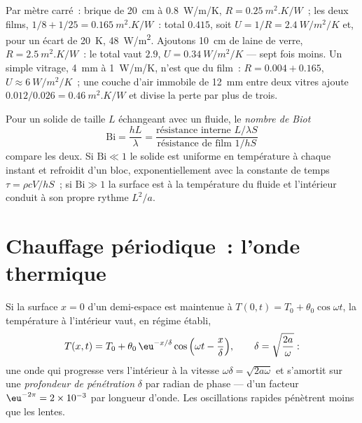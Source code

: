 \begin{example}\label{ex:b2:heat-conduction:wall}
Par mètre carré~: brique de \qty{20}{cm} à \qty{0.8}{W/m/K}, $R =
\qty{0.25}{m^2.K/W}$~; les deux films, $1/8 + 1/25 = \qty{0.165}{m^2.K/W}$~:
total $0.415$, soit $U = 1/R = \qty{2.4}{W/m^2/K}$ et, pour un écart de \qty{20}{K},
\qty{48}{W/m^2}. Ajoutons \qty{10}{cm} de laine de verre, $R =
\qty{2.5}{m^2.K/W}$~: le total vaut $2.9$, $U = \qty{0.34}{W/m^2/K}$ ---
sept fois moins. Un simple vitrage, \qty{4}{mm} à \qty{1}{W/m/K},
n'est que du film~: $R = 0.004 + 0.165$, $U \approx \qty{6}{W/m^2/K}$~; une
couche d'air immobile de \qty{12}{mm} entre deux vitres ajoute $0.012/0.026 =
\qty{0.46}{m^2.K/W}$ et divise la perte par plus de trois.
\end{example}

\begin{definition}\label{def:b2:heat-conduction:biot}
Pour un solide de taille $L$ échangeant avec un fluide, le \emph{nombre de
Biot}
\[
\mathrm{Bi} = \frac{hL}{\lambda} = \frac{\text{résistance interne } L/\lambda S}{\text{résistance de film } 1/hS}
\]
compare les deux. Si $\mathrm{Bi} \ll 1$ le solide est uniforme en
température à chaque instant et refroidit d'un bloc, exponentiellement avec
la constante de temps $\tau = \rho c V/hS$~; si $\mathrm{Bi} \gg 1$ la
surface est à la température du fluide et l'intérieur conduit à son
propre rythme $L^2/a$.
\end{definition}

\section{Chauffage périodique~: l'onde thermique}

\begin{proposition}\label{prop:b2:heat-conduction:wave}
Si la surface $x = 0$ d'un demi-espace est maintenue à $T(0,t) = T_0 +
\theta_0\cos\omega t$, la température à l'intérieur vaut, en régime
établi,
\[
T(x,t) = T_0 + \theta_0\,\eu^{-x/\delta}\cos\Big(\omega t - \frac{x}{\delta}\Big),
\qquad \delta = \sqrt{\frac{2a}{\omega}} :
\]
une onde qui progresse vers l'intérieur à la vitesse $\omega\delta =
\sqrt{2a\omega}$ et s'amortit sur une \emph{profondeur de pénétration} $\delta$
par radian de phase --- d'un facteur $\eu^{-2\pi} = 2 \times 10^{-3}$ par
longueur d'onde. Les oscillations rapides pénètrent moins que les lentes.
\end{proposition}


